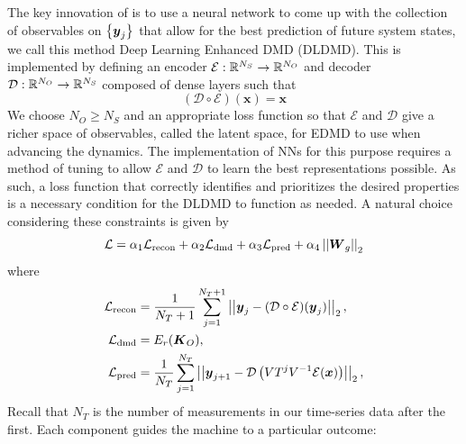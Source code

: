 The key innovation of 
\cite{lago} is to use a neural network to come up with the collection of 
observables on $\left\{\boldsymbol{y}_j\right\}$ that allow for the best prediction 
of future system states, we call this method Deep Learning Enhanced DMD (DLDMD). 
This is implemented by defining an encoder 
$\mathcal{E}: \mathbb{R}^{N_S} \to \mathbb{R}^{N_O}$ and decoder $\mathcal{D}: \mathbb{R}^{N_O} \to \mathbb{R}^{N_S}$ composed of 
dense layers such that 
\begin{equation}
    (\mathcal{D}\circ\mathcal{E})(\boldsymbol{x}) = \boldsymbol{x}
\end{equation}
We choose $N_O \geq N_S$ and an appropriate loss function so that 
$\mathcal{E}$ and $\mathcal{D}$ give a richer space of observables, called the 
latent space, for EDMD to use when advancing the dynamics. The implementation 
of NNs for this purpose requires a method of tuning to allow $\mathcal{E}$ and 
$\mathcal{D}$ to learn the best representations possible. As such, a loss 
function that correctly identifies and prioritizes the desired properties is 
a necessary condition for the DLDMD to function as needed. A natural choice
considering these constraints is given by
\begin{equation}
    \mathcal{L} = \alpha_1 \mathcal{L}_{\text{recon}} + \alpha_2 \mathcal{L}
    _{\text{dmd}} + \alpha_3 \mathcal{L}_{\text{pred}} +\alpha_4 
    \left|\left|\boldsymbol{W}_g\right|\right|_2 \label{eqn:loss function} 
\end{equation}
where 
\begin{align}
    \mathcal{L}_{\text{recon}} &= \frac{1}{N_T + 1}\sum_{j=1}^{N_T+1}\left|\left|\boldsymbol{y}_j - 
    (\mathcal{D}\circ\mathcal{E})(\boldsymbol{y}_j)\right|\right|_2, \\
    \mathcal{L}_{\text{dmd}} &= E_r(\boldsymbol{K}_O), \\
    \mathcal{L}_{\text{pred}} &= \frac{1}{N_T}\sum_{j=1}^{N_T}\left|\left|\boldsymbol{y}_{j+1} - 
    \mathcal{D}\left(VT^j V^{-1}\mathcal{E}(\boldsymbol{x})\right)\right|\right|_2, \label{eqn:blah}
\end{align}
Recall that $N_T$ is the number of measurements in our time-series data after the first.
Each component guides the machine to a particular outcome: 
